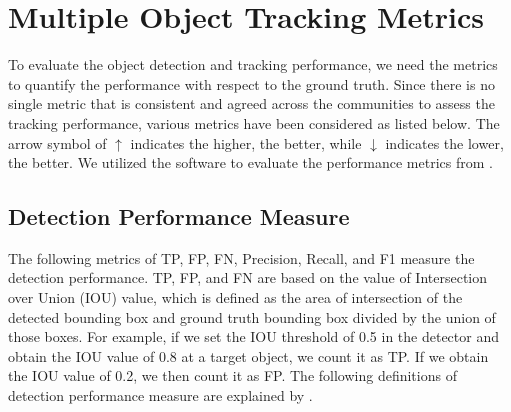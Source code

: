 \section{Multiple Object Tracking Metrics}
\label{sec:background/section_d}

To evaluate the object detection and tracking performance, we need the metrics to quantify the performance with respect to the ground truth. Since there is no single metric that is consistent and agreed across the communities to assess the tracking performance, various metrics have been considered as listed below. The arrow symbol of $\uparrow$ indicates the higher, the better, while $\downarrow$ indicates the lower, the better. We utilized the software to evaluate the performance metrics from \cite{heindl_cheindpy-motmetrics_2021}. 

\subsection{Detection Performance Measure}
The following metrics of TP, FP, FN, Precision, Recall, and F1 measure the detection performance. TP, FP, and FN are based on the value of Intersection over Union (IOU) value, which is defined as the area of intersection of the detected bounding box and ground truth bounding box divided by the union of those boxes. For example, if we set the IOU threshold of 0.5 in the detector and obtain the IOU value of 0.8 at a target object, we count it as TP. If we obtain the IOU value of 0.2, we then count it as FP. The following definitions of detection performance measure are explained by \cite{ristani_performance_2016} \cite{milan_mot16_2016}.

